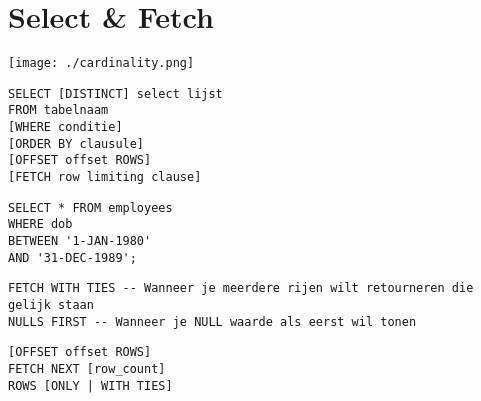 \section{Select \& Fetch}

\texttt{[image: ./cardinality.png]}

\begin{tiny}
\begin{lstlisting}
SELECT [DISTINCT] select lijst
FROM tabelnaam
[WHERE conditie]
[ORDER BY clausule]
[OFFSET offset ROWS]
[FETCH row limiting clause]
\end{lstlisting}

\begin{lstlisting}
SELECT * FROM employees
WHERE dob
BETWEEN '1-JAN-1980'
AND '31-DEC-1989';
\end{lstlisting}

\begin{lstlisting}
FETCH WITH TIES -- Wanneer je meerdere rijen wilt retourneren die gelijk staan
NULLS FIRST -- Wanneer je NULL waarde als eerst wil tonen
\end{lstlisting}

\begin{lstlisting}
[OFFSET offset ROWS]
FETCH NEXT [row_count]
ROWS [ONLY | WITH TIES]
\end{lstlisting}

\end{tiny}